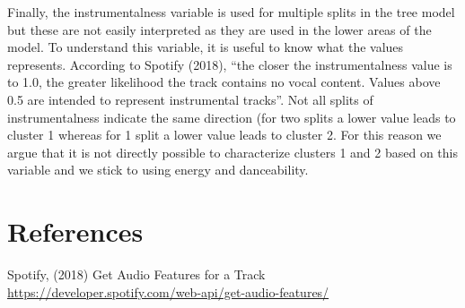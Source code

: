 \documentclass[]{article}
\begin{document}
Finally, the instrumentalness variable is used for multiple splits in
the tree model but these are not easily interpreted as they are used in
the lower areas of the model. To understand this variable, it is useful
to know what the values represents. According to Spotify (2018), ``the
closer the instrumentalness value is to 1.0, the greater likelihood the
track contains no vocal content. Values above 0.5 are intended to
represent instrumental tracks''. Not all splits of instrumentalness
indicate the same direction (for two splits a lower value leads to
cluster 1 whereas for 1 split a lower value leads to cluster 2. For this
reason we argue that it is not directly possible to characterize
clusters 1 and 2 based on this variable and we stick to using energy and
danceability.

\section{References}\label{references}

Spotify, (2018) Get Audio Features for a Track
\url{https://developer.spotify.com/web-api/get-audio-features/}
\end{document}
